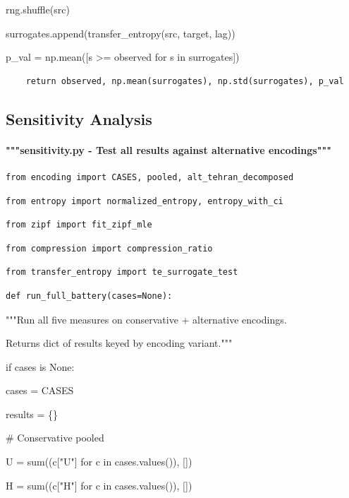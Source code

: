 \documentclass[11pt,letterpaper]{article}
\begin{document}
        rng.shuffle(src)


        surrogates.append(transfer\_entropy(src, target, lag))


    p\_val = np.mean([s >= observed for s in surrogates])

\begin{lstlisting}
    return observed, np.mean(surrogates), np.std(surrogates), p_val
\end{lstlisting}

\subsection{Sensitivity Analysis}

\paragraph{"""sensitivity.py - Test all results against alternative encodings"""}

\begin{lstlisting}
from encoding import CASES, pooled, alt_tehran_decomposed
\end{lstlisting}
\begin{lstlisting}
from entropy import normalized_entropy, entropy_with_ci
\end{lstlisting}
\begin{lstlisting}
from zipf import fit_zipf_mle
\end{lstlisting}
\begin{lstlisting}
from compression import compression_ratio
\end{lstlisting}
\begin{lstlisting}
from transfer_entropy import te_surrogate_test
\end{lstlisting}
\begin{lstlisting}
def run_full_battery(cases=None):
\end{lstlisting}

    """Run all five measures on conservative + alternative encodings.


    Returns dict of results keyed by encoding variant."""


    if cases is None:


        cases = CASES


    results = \{\}


    \# Conservative pooled


    U = sum((c["U"] for c in cases.values()), [])


    H = sum((c["H"] for c in cases.values()), [])
\end{document}
